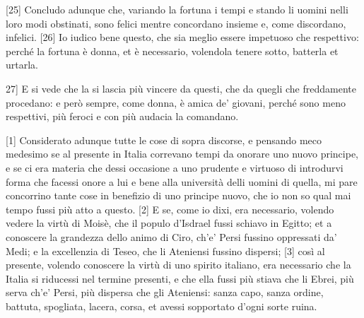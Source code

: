 {[}25{]} Concludo adunque che, variando la fortuna i tempi e stando li
uomini nelli loro modi obstinati, sono felici mentre concordano insieme
e, come discordano, infelici. {[}26{]} Io iudico bene questo, che sia
meglio essere impetuoso che respettivo: perché la fortuna è donna, et è
necessario, volendola tenere sotto, batterla et urtarla. \linebreak

\quebra

\noindent{}{[}27{]} E si
vede che la si lascia più vincere da questi, che da quegli che
freddamente procedano: e però sempre, come donna, è amica de' giovani,
perché sono meno respettivi, più feroci e con più audacia la comandano.


{[}1{]} Considerato adunque tutte le cose di sopra discorse, e pensando meco medesimo se al presente in Italia correvano tempi da onorare uno nuovo principe, e se ci era materia che dessi occasione a uno prudente e virtuoso di introdurvi forma che facessi onore a lui e bene alla università delli uomini di quella, mi pare concorrino tante cose in benefizio di uno principe nuovo, che io non so qual mai tempo fussi più atto a questo. {[}2{]} E se, come io dixi, era necessario, volendo vedere la virtù di Moisè, che il populo d'Isdrael fussi schiavo in Egitto; et a conoscere la grandezza dello animo di Ciro, ch'e' Persi fussino oppressati da' Medi; e la excellenzia di Teseo, che li Ateniensi fussino dispersi; {[}3{]} così al presente, volendo conoscere la virtù di uno spirito italiano, era necessario che la Italia si riducessi nel termine presenti, e che ella fussi più stiava che li Ebrei, più serva ch'e' Persi, più dispersa che gli Ateniensi: sanza capo, sanza ordine, battuta, spogliata, lacera, corsa, et avessi sopportato d'ogni sorte ruina.

